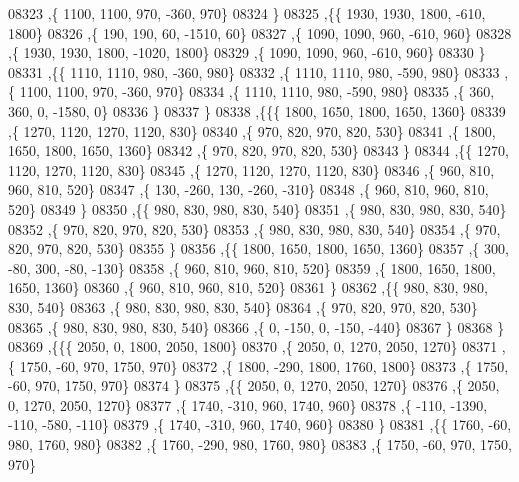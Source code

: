 \begin{DoxyCode}
08323     ,\{  1100,  1100,   970,  -360,   970\}
08324     \}
08325    ,\{\{  1930,  1930,  1800,  -610,  1800\}
08326     ,\{   190,   190,    60, -1510,    60\}
08327     ,\{  1090,  1090,   960,  -610,   960\}
08328     ,\{  1930,  1930,  1800, -1020,  1800\}
08329     ,\{  1090,  1090,   960,  -610,   960\}
08330     \}
08331    ,\{\{  1110,  1110,   980,  -360,   980\}
08332     ,\{  1110,  1110,   980,  -590,   980\}
08333     ,\{  1100,  1100,   970,  -360,   970\}
08334     ,\{  1110,  1110,   980,  -590,   980\}
08335     ,\{   360,   360,     0, -1580,     0\}
08336     \}
08337    \}
08338   ,\{\{\{  1800,  1650,  1800,  1650,  1360\}
08339     ,\{  1270,  1120,  1270,  1120,   830\}
08340     ,\{   970,   820,   970,   820,   530\}
08341     ,\{  1800,  1650,  1800,  1650,  1360\}
08342     ,\{   970,   820,   970,   820,   530\}
08343     \}
08344    ,\{\{  1270,  1120,  1270,  1120,   830\}
08345     ,\{  1270,  1120,  1270,  1120,   830\}
08346     ,\{   960,   810,   960,   810,   520\}
08347     ,\{   130,  -260,   130,  -260,  -310\}
08348     ,\{   960,   810,   960,   810,   520\}
08349     \}
08350    ,\{\{   980,   830,   980,   830,   540\}
08351     ,\{   980,   830,   980,   830,   540\}
08352     ,\{   970,   820,   970,   820,   530\}
08353     ,\{   980,   830,   980,   830,   540\}
08354     ,\{   970,   820,   970,   820,   530\}
08355     \}
08356    ,\{\{  1800,  1650,  1800,  1650,  1360\}
08357     ,\{   300,   -80,   300,   -80,  -130\}
08358     ,\{   960,   810,   960,   810,   520\}
08359     ,\{  1800,  1650,  1800,  1650,  1360\}
08360     ,\{   960,   810,   960,   810,   520\}
08361     \}
08362    ,\{\{   980,   830,   980,   830,   540\}
08363     ,\{   980,   830,   980,   830,   540\}
08364     ,\{   970,   820,   970,   820,   530\}
08365     ,\{   980,   830,   980,   830,   540\}
08366     ,\{     0,  -150,     0,  -150,  -440\}
08367     \}
08368    \}
08369   ,\{\{\{  2050,     0,  1800,  2050,  1800\}
08370     ,\{  2050,     0,  1270,  2050,  1270\}
08371     ,\{  1750,   -60,   970,  1750,   970\}
08372     ,\{  1800,  -290,  1800,  1760,  1800\}
08373     ,\{  1750,   -60,   970,  1750,   970\}
08374     \}
08375    ,\{\{  2050,     0,  1270,  2050,  1270\}
08376     ,\{  2050,     0,  1270,  2050,  1270\}
08377     ,\{  1740,  -310,   960,  1740,   960\}
08378     ,\{  -110, -1390,  -110,  -580,  -110\}
08379     ,\{  1740,  -310,   960,  1740,   960\}
08380     \}
08381    ,\{\{  1760,   -60,   980,  1760,   980\}
08382     ,\{  1760,  -290,   980,  1760,   980\}
08383     ,\{  1750,   -60,   970,  1750,   970\}

\end{DoxyCode}
